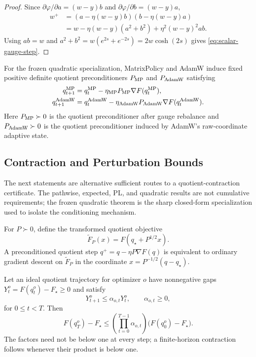 \begin{proof}
Since $\partial\varphi/\partial a=(w-y)b$ and $\partial\varphi/\partial b=(w-y)a$,
\begin{align}
    w^+
    &=(a-\eta(w-y)b)(b-\eta(w-y)a) \\
    &=w-\eta(w-y)(a^2+b^2)+\eta^2(w-y)^2ab.
\end{align}
Using $ab=w$ and $a^2+b^2=w(e^{2s}+e^{-2s})=2w\cosh(2s)$ gives
\eqref{eq:scalar-gauge-step}.
\end{proof}

For the frozen quadratic specialization, MatrixPolicy and AdamW induce fixed positive
definite quotient preconditioners $P_{\operatorname{MP}}$ and $P_{\operatorname{AdamW}}$ satisfying
\begin{align}
    q_{t+1}^{\operatorname{MP}}
    &=q_t^{\operatorname{MP}}-\eta_{\operatorname{MP}}P_{\operatorname{MP}}\nabla F(q_t^{\operatorname{MP}}),
    \label{eq:mp-ideal-dynamics}\\
    q_{t+1}^{\operatorname{AdamW}}
    &=q_t^{\operatorname{AdamW}}-\eta_{\operatorname{AdamW}}P_{\operatorname{AdamW}}\nabla F(q_t^{\operatorname{AdamW}}).
    \label{eq:aw-ideal-dynamics}
\end{align}
Here $P_{\operatorname{MP}}\succ0$ is the quotient preconditioner after gauge rebalance and
$P_{\operatorname{AdamW}}\succ0$ is the quotient preconditioner induced by AdamW's raw-coordinate adaptive
state.

\subsection{Contraction and Perturbation Bounds}
\label{app:complete-opt-proof:contraction}

The next statements are alternative sufficient routes to a quotient-contraction
certificate.  The pathwise, expected, PL, and quadratic results are not cumulative
requirements; the frozen quadratic theorem is the sharp closed-form specialization used to
isolate the conditioning mechanism.

For $P\succ0$, define the transformed quotient objective
\begin{equation}
    \widetilde F_P(x)=F(q_\star+P^{1/2}x).
    \label{eq:transformed-objective}
\end{equation}
A preconditioned quotient step $q^+=q-\eta P\nabla F(q)$ is equivalent to ordinary
gradient descent on $\widetilde F_P$ in the coordinate $x=P^{-1/2}(q-q_\star)$.


\begin{lemma}
\label{lem:pathwise-contraction-certificate}
Let an ideal quotient trajectory for optimizer $o$ have nonnegative gaps
$Y_t^o=F(q_t^o)-F_\star\geq0$ and satisfy
\begin{equation}
    Y_{t+1}^o
    \leq
    \alpha_{o,t}Y_t^o,
    \qquad \alpha_{o,t}\geq0,
    \label{eq:pathwise-certificate}
\end{equation}
for $0\leq t<T$.  Then
\begin{equation}
    F(q_T^o)-F_\star
    \leq
    \left(\prod_{t=0}^{T-1}\alpha_{o,t}\right)
    \bigl(F(q_0^o)-F_\star\bigr).
    \label{eq:pathwise-certificate-product}
\end{equation}
The factors need not be below one at every step; a finite-horizon contraction follows
whenever their product is below one.
\end{lemma}

